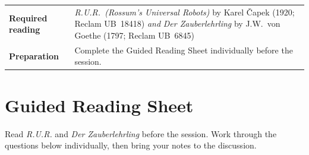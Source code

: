 \vspace{3.5em}

\begin{tabular}{p{3.8cm} p{6.5cm}}
    \textbf{Required reading} &
        \textit{R.U.R.\ (Rossum's Universal Robots)}\cite{capek1920rur}
        by Karel \v{C}apek (1920; Reclam UB~18418)
        \emph{and}
        \textit{Der Zauberlehrling}\index{Goethe, Johann Wolfgang von}\index{Der Zauberlehrling}\cite{goethe1797zauberlehrling}
        by J.W.\ von Goethe (1797; Reclam UB~6845) \\[3pt]
    \textbf{Preparation}      &
        Complete the Guided Reading Sheet individually before the session. \\
\end{tabular}

\vspace{3.5em}

\section*{Guided Reading Sheet}

\noindent Read \emph{R.U.R.} and \emph{Der Zauberlehrling} before the session. Work
through the questions below individually, then bring your notes to the discussion.


